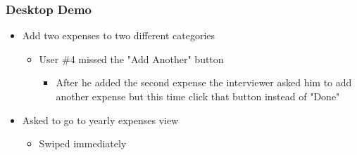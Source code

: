 \documentclass{chi2011}
\begin{document}
\begin{itemize}[noitemsep]
	\subsubsection{Desktop Demo}
	\begin{itemize}[noitemsep] 
		\item Add two expenses to two different categories
		\begin{itemize}[noitemsep]
			\item User \#4 missed the "Add Another" button
			\begin{itemize}[noitemsep]
				\item After he added the second expense the interviewer asked him to add another expense 
					  but this time click that button instead of "Done"
			\end{itemize}
		\end{itemize}
	\item Asked to go to yearly expenses view
		\begin{itemize}[noitemsep]
			\item Swiped immediately
		\end{itemize}
	\end{itemize}


\end{itemize}
\end{document}

